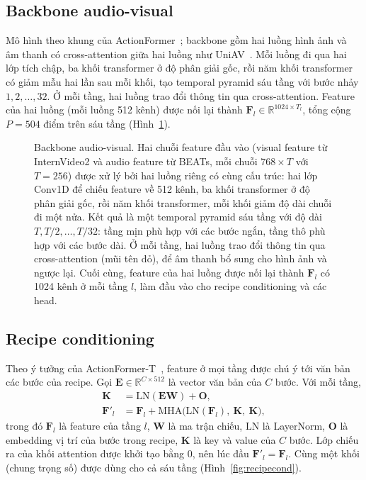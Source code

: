 \documentclass{IEEEtran}
\begin{document}
\subsection{Backbone audio-visual}
Mô hình theo khung của ActionFormer~\cite{actionformer}; backbone gồm hai luồng hình ảnh và âm thanh có cross-attention giữa hai luồng như UniAV~\cite{uniav}. Mỗi luồng đi qua hai lớp tích chập, ba khối transformer ở độ phân giải gốc, rồi năm khối transformer có giảm mẫu hai lần sau mỗi khối, tạo temporal pyramid sáu tầng với bước nhảy $1, 2, \ldots, 32$. Ở mỗi tầng, hai luồng trao đổi thông tin qua cross-attention. Feature của hai luồng (mỗi luồng 512 kênh) được nối lại thành $\mathbf{F}_l \in \mathbb{R}^{1024 \times T_l}$, tổng cộng $P = 504$ điểm trên sáu tầng (Hình~\ref{fig:backbone}).

\begin{figure}[t]
\centering
\resizebox{\columnwidth}{!}{}
\caption{Backbone audio-visual. Hai chuỗi feature đầu vào (visual feature từ InternVideo2 và audio feature từ BEATs, mỗi chuỗi $768 \times T$ với $T = 256$) được xử lý bởi hai luồng riêng có cùng cấu trúc: hai lớp Conv1D để chiếu feature về 512 kênh, ba khối transformer ở độ phân giải gốc, rồi năm khối transformer, mỗi khối giảm độ dài chuỗi đi một nửa. Kết quả là một temporal pyramid sáu tầng với độ dài $T, T/2, \ldots, T/32$: tầng mịn phù hợp với các bước ngắn, tầng thô phù hợp với các bước dài. Ở mỗi tầng, hai luồng trao đổi thông tin qua cross-attention (mũi tên đỏ), để âm thanh bổ sung cho hình ảnh và ngược lại. Cuối cùng, feature của hai luồng được nối lại thành $\mathbf{F}_l$ có 1024 kênh ở mỗi tầng $l$, làm đầu vào cho recipe conditioning và các head.}
\label{fig:backbone}
\end{figure}

\subsection{Recipe conditioning}
Theo ý tưởng của ActionFormer-T~\cite{htstep}, feature ở mọi tầng được chú ý tới văn bản các bước của recipe. Gọi $\mathbf{E} \in \mathbb{R}^{C \times 512}$ là vector văn bản của $C$ bước. Với mỗi tầng,
\begin{equation}
\label{eq:artc}
\begin{aligned}
\mathbf{K} &= \mathrm{LN}(\mathbf{E}\mathbf{W}) + \mathbf{O},\\
\mathbf{F}'_l &= \mathbf{F}_l + \mathrm{MHA}\big(\mathrm{LN}(\mathbf{F}_l),\ \mathbf{K},\ \mathbf{K}\big),
\end{aligned}
\end{equation}
trong đó $\mathbf{F}_l$ là feature của tầng $l$, $\mathbf{W}$ là ma trận chiếu, $\mathrm{LN}$ là LayerNorm, $\mathbf{O}$ là embedding vị trí của bước trong recipe, $\mathbf{K}$ là key và value của $C$ bước. Lớp chiếu ra của khối attention được khởi tạo bằng 0, nên lúc đầu $\mathbf{F}'_l = \mathbf{F}_l$. Cùng một khối (chung trọng số) được dùng cho cả sáu tầng (Hình~\ref{fig:recipecond}).
\end{document}
